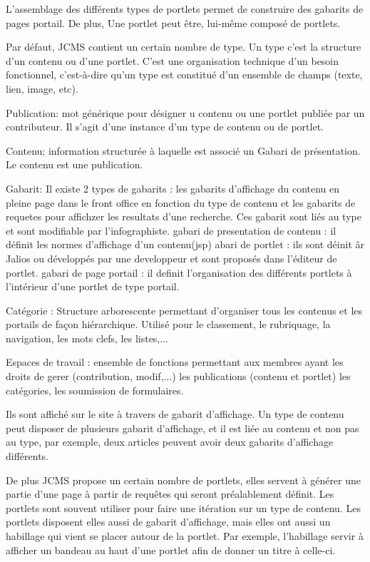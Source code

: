 \documentclass[12pt,a4paper]{article}
\begin{document}
L'assemblage des différents types de portlets permet de construire des gabarits de pages portail. De plus, Une portlet peut être, lui-même composé de portlets.\par 
Par défaut, JCMS contient un certain nombre de type. Un type c'est la structure d'un contenu ou d'une portlet. C'est une organisation technique d'un besoin fonctionnel, c'est-à-dire qu'un type est constitué d'un ensemble de champs (texte, lien, image, etc).\par 
Publication: mot générique pour désigner u contenu ou une portlet publiée par un contributeur. Il s'agit d'une instance d'un type de contenu ou de portlet.\par 
Contenu; information structurée à laquelle est associé un Gabari de présentation. Le contenu est une publication.\par 
Gabarit: Il existe 2 types de gabarits : les gabarits d'affichage du contenu en pleine page dans le front office en fonction du type de contenu et les gabarits de requetes pour affichzer les resultats d'une recherche. Ces gabarit sont liés au type et sont modifiable par l'infographiste.
gabari de presentation de contenu : il définit les normes d'affichage d'un contenu(jsp)
abari de portlet : ils sont déinit âr Jalios ou développés par une developpeur et sont proposés dans l'éditeur de portlet.
gabari de page portail :  il definit l'organisation des différents portlets à l'intérieur d'une portlet de type portail.\par 
Catégorie : Structure arborescente permettant d'organiser tous les contenus et les portails de façon hiérarchique. Utilisé pour le classement, le rubriquage, la navigation, les mots clefs, les listes,...\par 
Espaces de travail : ensemble de fonctions permettant aux membres ayant les droits de gerer (contribution, modif,...) les publications (contenu et portlet) les catégories, les soumission de formulaires.\par 
Ils sont affiché sur le site à travers de gabarit d'affichage. Un type de contenu peut disposer de plusieurs gabarit d'affichage, et il est liée au contenu et non pas au type, par exemple, deux articles peuvent avoir deux gabarits d'affichage différents.\par
De plus JCMS propose un certain nombre de portlets, elles servent à générer une partie d'une page à partir de requêtes qui seront préalablement définit. Les portlets sont souvent utiliser pour faire une itération sur un type de contenu. Les portlets disposent elles aussi de gabarit d'affichage, mais elles ont aussi un habillage qui vient se placer autour de la portlet. Par exemple, l'habillage servir à afficher un bandeau au haut d'une portlet afin de donner un titre à celle-ci.\par
\end{document}
